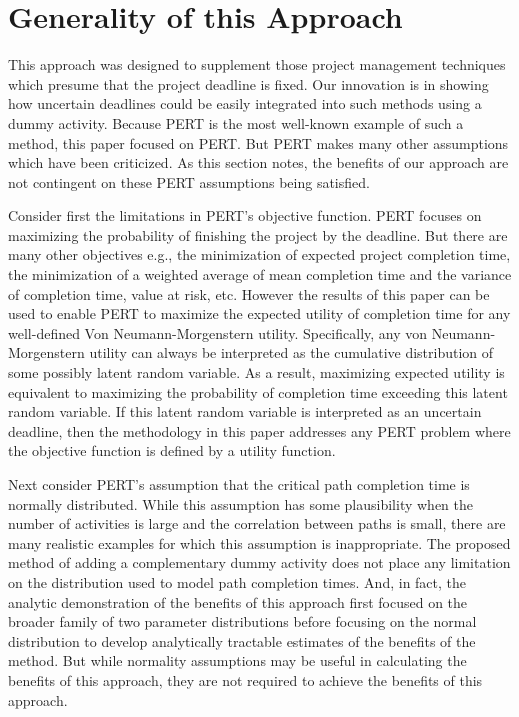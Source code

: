 \documentclass[11pt]{article}
\begin{document}
\section{Generality of this Approach}
This approach was designed to supplement those project management techniques which presume that the project deadline is fixed.  Our innovation is in showing how uncertain deadlines could be easily integrated into such methods using a dummy activity.  Because PERT is the most well-known example of such a method,  this paper focused on PERT.  But PERT makes many other assumptions which have been criticized.  As this section notes, the benefits of our approach are not contingent on these PERT assumptions being satisfied. \par
Consider first the limitations in PERT's objective function.  PERT focuses on maximizing the probability of finishing the project by the deadline.  But there are many other objectives e.g., the minimization of expected project completion time, the minimization of a weighted average of mean completion time and the variance of completion time, value at risk, etc.   However the results of this paper can be used to enable PERT to maximize the expected utility of completion time for any well-defined Von Neumann-Morgenstern utility.  Specifically, any 
von Neumann-Morgenstern utility can always be interpreted as the cumulative distribution of some possibly latent random variable.  As a result, maximizing  expected utility is equivalent to maximizing the probability of completion time exceeding this latent random variable. If this latent random variable is interpreted as an uncertain deadline, then the methodology in this paper addresses any PERT problem where the objective function is defined by a utility function.\par
Next consider PERT's assumption that the critical path completion time is normally distributed.  While this assumption has some plausibility when the number of activities is large and the correlation between paths is small, there are many realistic examples for which this assumption is inappropriate.  The proposed method of adding a complementary dummy activity does not place any limitation on the distribution used to model path completion times.  And, in fact, the analytic demonstration of the benefits of this approach first focused on the broader family of two parameter distributions before focusing on the normal distribution to develop analytically tractable estimates of the benefits of the method.  But while normality assumptions may be useful in calculating the benefits of this approach, they are not required to achieve the benefits of this approach.\par
\end{document}
